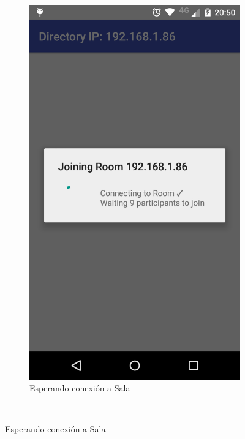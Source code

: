 \begin{figure}[h]
    \centering
    \begin{subfigure}[b]{0.4\textwidth}
        \includegraphics[width=\textwidth]{imagenes/mobile_connecting.png}
        \caption{Esperando conexión a Sala}
        \label{fig:mobile_waiting}
    \end{subfigure}
    ~ %

\end{figure}

